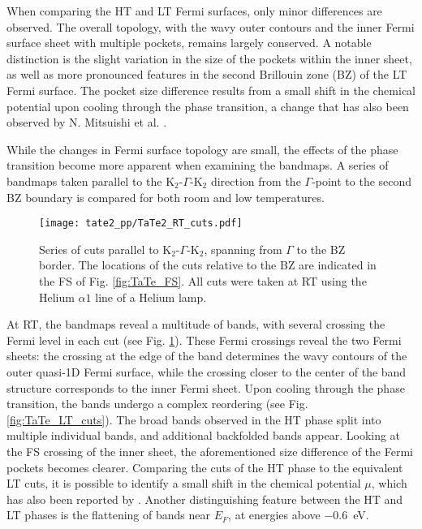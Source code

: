 When comparing the HT and LT Fermi surfaces, only minor differences are observed.
The overall topology, with the wavy outer contours and the inner Fermi surface sheet with multiple pockets, remains largely conserved.
A notable distinction is the slight variation in the size of the pockets within the inner sheet, as well as more pronounced features in the second Brillouin zone (BZ) of the LT Fermi surface.
The pocket size difference results from a small shift in the chemical potential upon cooling through the phase transition, a change that has also been observed by N. Mitsuishi et al. \cite{mitsuishi_unveiling_2024}.

While the changes in Fermi surface topology are small, the effects of the phase transition become more apparent when examining the bandmaps.
A series of bandmaps taken parallel to the K$_2$-$\Gamma$-K$_2$ direction from the $\Gamma$-point to the second BZ boundary is compared for both room and low temperatures.

\begin{figure}[t!]
	\centering
	\texttt{[image: tate2\_pp/TaTe2\_RT\_cuts.pdf]}
	\caption{Series of cuts parallel to K$_2$-$\Gamma$-K$_2$, spanning from $\Gamma$ to the BZ border. The locations of the cuts relative to the BZ are indicated in the FS of Fig. \ref{fig:TaTe_FS}. All cuts were taken at RT using the Helium $\alpha1$ line of a Helium lamp.}
	\label{fig:TaTe_RT_cuts}
\end{figure}

At RT, the bandmaps reveal a multitude of bands, with several crossing the Fermi level in each cut (see Fig. \ref{fig:TaTe_RT_cuts}).
These Fermi crossings reveal the two Fermi sheets: the crossing at the edge of the band determines the wavy contours of the outer quasi-1D Fermi surface, while the crossing closer to the center of the band structure corresponds to the inner Fermi sheet.
Upon cooling through the phase transition, the bands undergo a complex reordering (see Fig. \ref{fig:TaTe_LT_cuts}).
The broad bands observed in the HT phase split into multiple individual bands, and additional backfolded bands appear.
Looking at the FS crossing of the inner sheet, the aforementioned size difference of the Fermi pockets becomes clearer.
Comparing the cuts of the HT phase to the equivalent LT cuts, it is possible to identify a small shift in the chemical potential $\mu$, which has also been reported by \cite{mitsuishi_unveiling_2024}.
Another distinguishing feature between the HT and LT phases is the flattening of bands near $E_F$, at energies above \qty{-0.6}{\electronvolt}.

